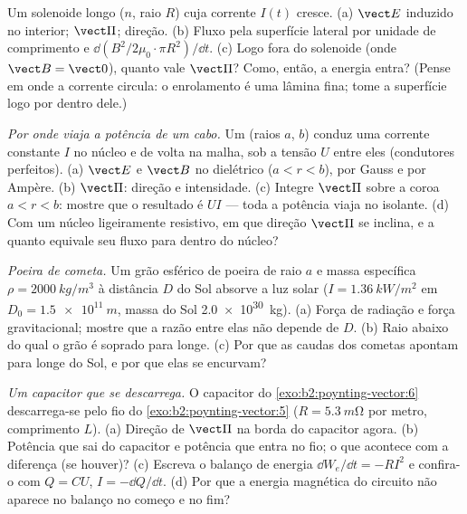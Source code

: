 \begin{exercise}[$\star\star$]\label{exo:b2:poynting-vector:7}
Um solenoide longo ($n$, raio $R$) cuja corrente $I(t)$ cresce. (a)
$\vect E$ induzido no interior; $\vect\Pi$; direção. (b) Fluxo pela
superfície lateral por unidade de comprimento e $\dd(B^2/2\mu_0\cdot\pi R^2)/\dd t$. (c)
Logo fora do solenoide (onde $\vect B = \vect 0$), quanto vale $\vect\Pi$?
Como, então, a energia entra? (Pense em onde a corrente circula:
o enrolamento é uma lâmina fina; tome a superfície logo por dentro dele.)
\end{exercise}

\begin{exercise}[$\star\star$]\label{exo:b2:poynting-vector:8}
\emph{Por onde viaja a potência de um cabo.} Um  (raios $a$,
$b$) conduz uma corrente constante $I$ no núcleo e de volta na malha, sob
a tensão $U$ entre eles (condutores perfeitos). (a) $\vect E$ e $\vect B$
no dielétrico ($a < r < b$), por Gauss e por Ampère. (b) $\vect\Pi$:
direção e intensidade. (c) Integre $\vect\Pi$ sobre a coroa $a < r
< b$: mostre que o resultado é $UI$ --- toda a potência viaja no
isolante. (d) Com um núcleo ligeiramente resistivo, em que direção
$\vect\Pi$ se inclina, e a quanto equivale seu fluxo para dentro do núcleo?
\end{exercise}

\begin{exercise}[$\star\star$]\label{exo:b2:poynting-vector:9}
\emph{Poeira de cometa.} Um grão esférico de poeira de raio $a$ e massa específica
$\rho = \qty{2000}{kg/m^3}$ à distância $D$ do Sol absorve a
luz solar ($I = \qty{1.36}{kW/m^2}$ em $D_0 = \qty{1.5e11}{m}$, massa do Sol
\qty{2.0e30}{kg}). (a) Força de radiação e força gravitacional; mostre que
a razão entre elas não depende de $D$. (b) Raio abaixo do qual o grão é
soprado para longe. (c) Por que as caudas dos cometas apontam para longe do Sol, e por que
elas se encurvam?
\end{exercise}

\begin{exercise}[$\star\star\star$]\label{exo:b2:poynting-vector:10}
\emph{Um capacitor que se descarrega.} O capacitor do
\cref{exo:b2:poynting-vector:6} descarrega-se pelo fio do
\cref{exo:b2:poynting-vector:5} ($R = \qty{5.3}{m\ohm}$ por metro, comprimento
$L$). (a) Direção de $\vect\Pi$ na borda do capacitor agora. (b) Potência
que sai do capacitor e potência que entra no fio; o que acontece com a
diferença (se houver)? (c) Escreva o balanço de energia $\dd W_e/\dd t = -RI^2$
e confira-o com $Q = CU$, $I = -\dd Q/\dd t$. (d) Por que a
energia magnética do circuito não aparece no balanço no
começo e no fim?
\end{exercise}

